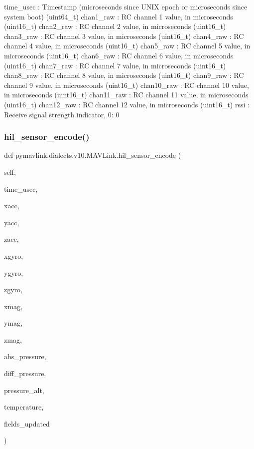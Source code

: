 \begin{DoxyVerb}
\begin{DoxyVerb}
\begin{DoxyVerb}
\begin{DoxyVerb}
time_usec                 : Timestamp (microseconds since UNIX epoch or microseconds since system boot) (uint64_t)
chan1_raw                 : RC channel 1 value, in microseconds (uint16_t)
chan2_raw                 : RC channel 2 value, in microseconds (uint16_t)
chan3_raw                 : RC channel 3 value, in microseconds (uint16_t)
chan4_raw                 : RC channel 4 value, in microseconds (uint16_t)
chan5_raw                 : RC channel 5 value, in microseconds (uint16_t)
chan6_raw                 : RC channel 6 value, in microseconds (uint16_t)
chan7_raw                 : RC channel 7 value, in microseconds (uint16_t)
chan8_raw                 : RC channel 8 value, in microseconds (uint16_t)
chan9_raw                 : RC channel 9 value, in microseconds (uint16_t)
chan10_raw                : RC channel 10 value, in microseconds (uint16_t)
chan11_raw                : RC channel 11 value, in microseconds (uint16_t)
chan12_raw                : RC channel 12 value, in microseconds (uint16_t)
rssi                      : Receive signal strength indicator, 0: 0%
 \mbox{\label{classpymavlink_1_1dialects_1_1v10_1_1MAVLink_aa055d830580f983735e2ecc9ba64b2b6}} 
\subsubsection{\texorpdfstring{hil\+\_\+sensor\+\_\+encode()}{hil\_sensor\_encode()}}
{\footnotesize\ttfamily def pymavlink.\+dialects.\+v10.\+M\+A\+V\+Link.\+hil\+\_\+sensor\+\_\+encode (\begin{DoxyParamCaption}\item[{}]{self,  }\item[{}]{time\+\_\+usec,  }\item[{}]{xacc,  }\item[{}]{yacc,  }\item[{}]{zacc,  }\item[{}]{xgyro,  }\item[{}]{ygyro,  }\item[{}]{zgyro,  }\item[{}]{xmag,  }\item[{}]{ymag,  }\item[{}]{zmag,  }\item[{}]{abs\+\_\+pressure,  }\item[{}]{diff\+\_\+pressure,  }\item[{}]{pressure\+\_\+alt,  }\item[{}]{temperature,  }\item[{}]{fields\+\_\+updated }\end{DoxyParamCaption})}


\end{DoxyVerb}
\end{DoxyVerb}
\end{DoxyVerb}
\end{DoxyVerb}
